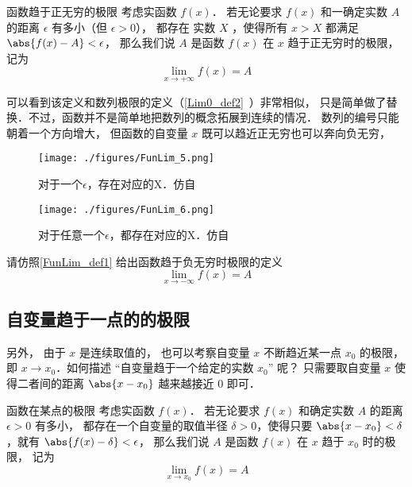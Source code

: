 \begin{definition}{函数趋于正无穷的极限}\label{FunLim_def1}
考虑实函数 $f(x)$． 若无论要求 $f(x)$ 和一确定实数 $A$ 的距离 $\epsilon$ 有多小（但 $\epsilon>0$）， 都存在 实数 $X$ ，使得所有 $x>X$ 都满足 $\abs{f(x)-A}<\epsilon$， 那么我们说 $A$ 是函数 $f(x)$ 在 $x$ 趋于正无穷时的极限， 记为
\begin{equation}
\lim\limits_{x\to +\infty} f(x) = A
\end{equation}
\end{definition}

可以看到该定义和数列极限的定义（\autoref{Lim0_def2}~）非常相似， 只是简单做了替换．不过，函数并不是简单地把数列的概念拓展到连续的情况． 数列的编号只能朝着一个方向增大， 但函数的自变量 $x$ 既可以趋近正无穷也可以奔向负无穷， 

\begin{figure}[ht]
\centering
\texttt{[image: ./figures/FunLim\_5.png]}
\caption{对于一个$\epsilon$，存在对应的X．仿自\cite{Thomas}} \label{FunLim_fig5}
\end{figure}

\begin{figure}[ht]
\centering
\texttt{[image: ./figures/FunLim\_6.png]}
\caption{对于任意一个$\epsilon$，都存在对应的X．仿自\cite{Thomas}} \label{FunLim_fig6}
\end{figure}

\begin{exercise}{}
请仿照\autoref{FunLim_def1} 给出函数趋于负无穷时极限的定义
\begin{equation}
\lim\limits_{x\to -\infty} f(x) = A
\end{equation}
\end{exercise}

\subsection{自变量趋于一点的的极限}
另外， 由于 $x$ 是连续取值的， 也可以考察自变量 $x$ 不断趋近某一点 $x_0$ 的极限， 即 $x\to x_0$．如何描述 “自变量趋于一个给定的实数 $x_0$” 呢？ 只需要取自变量 $x$ 使得二者间的距离 $\abs{x-x_0}$ 越来越接近 $0$ 即可．
\begin{definition}{函数在某点的极限}\label{FunLim_def3}
考虑实函数 $f(x)$． 若无论要求 $f(x)$ 和确定实数 $A$ 的距离 $\epsilon>0$ 有多小， 都存在一个自变量的取值半径 $\delta>0$，使得只要 $\abs{x-x_0} < \delta$，就有 $\abs{f(x)-\delta}<\epsilon$，
那么我们说 $A$ 是函数 $f(x)$ 在 $x$ 趋于 $x_0$ 时的极限， 记为
\begin{equation}
\lim\limits_{x\to x_0}f(x)=A
\end{equation}
\end{definition}

